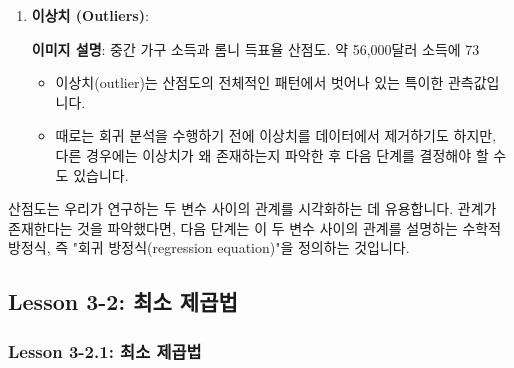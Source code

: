 \documentclass[11pt,a4paper]{article}
\theoremstyle{definition}
\begin{document}
\begin{tcolorbox}[infobox, title=산점도 분석 (Looking at Scatter Plots)]
\begin{enumerate}[label=\arabic*.]
    \item \textbf{이상치 (Outliers)}:
    \begin{center}
    \end{center}
    \textbf{이미지 설명}: 중간 가구 소득과 롬니 득표율 산점도. 약 56,000달러 소득에 73%
    \begin{itemize}
        \item 이상치(outlier)는 산점도의 전체적인 패턴에서 벗어나 있는 특이한 관측값입니다.
        \item 때로는 회귀 분석을 수행하기 전에 이상치를 데이터에서 제거하기도 하지만, 다른 경우에는 이상치가 왜 존재하는지 파악한 후 다음 단계를 결정해야 할 수도 있습니다.
    \end{itemize}
\end{enumerate}
산점도는 우리가 연구하는 두 변수 사이의 관계를 시각화하는 데 유용합니다. 관계가 존재한다는 것을 파악했다면, 다음 단계는 이 두 변수 사이의 관계를 설명하는 수학적 방정식, 즉 "회귀 방정식(regression equation)"을 정의하는 것입니다.
\end{tcolorbox}

\newpage
\subsection{Lesson 3-2: 최소 제곱법}

\subsubsection{Lesson 3-2.1: 최소 제곱법}
\end{document}
